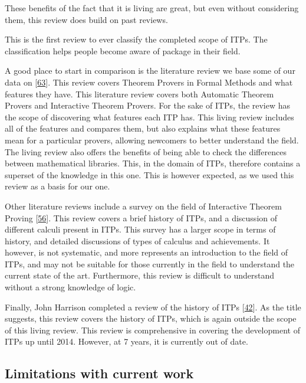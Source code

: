 \documentclass[
]{article}
\begin{document}
These benefits of the fact that it is living are great, but even without
considering them, this review does build on past reviews.

This is the first review to ever classify the completed scope of ITPs.
The classification helps people become aware of package in their field.

A good place to start in comparison is the literature review we base
some of our data on {[}\protect\hyperlink{ref-nawaz_survey_2019}{63}{]}.
This review covers Theorem Provers in Formal Methods and what features
they have. This literature review covers both Automatic Theorem Provers
and Interactive Theorem Provers. For the sake of ITPs, the review has
the scope of discovering what features each ITP has. This living review
includes all of the features and compares them, but also explains what
these features mean for a particular provers, allowing newcomers to
better understand the field. The living review also offers the benefits
of being able to check the differences between mathematical libraries.
This, in the domain of ITPs, therefore contains a superset of the
knowledge in this one. This is however expected, as we used this review
as a basis for our one.

Other literature reviews include a survey on the field of Interactive
Theorem Proving {[}\protect\hyperlink{ref-a_survey_of_itp}{56}{]}. This
review covers a brief history of ITPs, and a discussion of different
calculi present in ITPs. This survey has a larger scope in terms of
history, and detailed discussions of types of calculus and achievements.
It however, is not systematic, and more represents an introduction to
the field of ITPs, and may not be suitable for those currently in the
field to understand the current state of the art. Furthermore, this
review is difficult to understand without a strong knowledge of logic.

Finally, John Harrison completed a review of the history of ITPs
{[}\protect\hyperlink{ref-history_of_itps}{42}{]}. As the title
suggests, this review covers the history of ITPs, which is again outside
the scope of this living review. This review is comprehensive in
covering the development of ITPs up until 2014. However, at 7 years, it
is currently out of date.

\hypertarget{limitations-with-current-work}{%
\subsection{Limitations with current
work}\label{limitations-with-current-work}}
\end{document}
